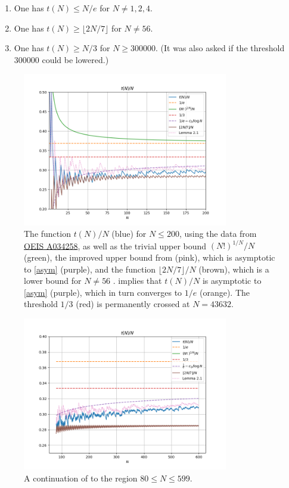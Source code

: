 \documentclass[12pt,a4paper,reqno]{amsart}
\numberwithin{equation}{section}
\theoremstyle{plain}
\theoremstyle{definition}
\begin{document}
\begin{enumerate}
\item One has $t(N) \leq N/e$ for $N \neq 1,2,4$.
\item One has $t(N) \geq \lfloor 2N/7 \rfloor$ for $N \neq 56$.
\item One has $t(N) \geq N/3$ for $N \geq 300000$.  (It was also asked if the threshold $300000$ could be lowered.) 
\end{enumerate}

\begin{figure}
  \centering
  \includegraphics[width=0.8\textwidth]{newplot_200.png}
  \caption{The function $t(N)/N$ (blue) for $N \leq 200$, using the data from \href{https://oeis.org/A034258}{OEIS A034258}, as well as the trivial upper bound $(N!)^{1/N}/N$ (green), the improved upper bound from  (pink), which is asymptotic to \eqref{asym} (purple), and the function $\lfloor 2N/7 \rfloor/N$ (brown), which is a lower bound for $N \neq 56$ \cite{guy}.   implies that $t(N)/N$ is asymptotic to \eqref{asym} (purple), which in turn converges to $1/e$ (orange).  The threshold $1/3$ (red) is permanently crossed at $N=43632$.}\label{fig1}
  \end{figure}
  
  \begin{figure}
    \centering
    \includegraphics[width=0.8\textwidth]{newplot_600_all.png}
    \caption{A continuation of  to the region $80 \leq N \leq 599$.}\label{fig1-alt}
  \end{figure}
  
\end{document}

